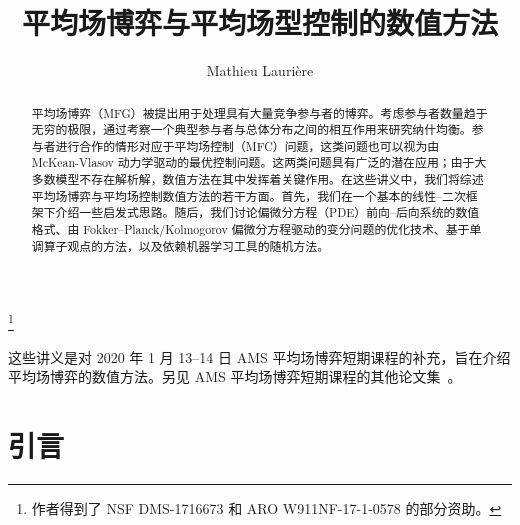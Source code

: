 \documentclass{amsproc}
\theoremstyle{definition}
\theoremstyle{remark}
\numberwithin{equation}{section}
\begin{document}
\title[平均场博弈与平均场控制的数值方法]{平均场博弈与平均场型控制的数值方法}


\author{Mathieu Lauri{\`e}re}
\address{普林斯顿大学运筹学与金融工程系（ORFE），Sherrerd Hall，美国新泽西州普林斯顿}
\curraddr{}
\thanks{作者得到了 NSF DMS-1716673 和 ARO W911NF-17-1-0578 的部分资助。}



\date{}

\begin{abstract}
平均场博弈（MFG）被提出用于处理具有大量竞争参与者的博弈。考虑参与者数量趋于无穷的极限，通过考察一个典型参与者与总体分布之间的相互作用来研究纳什均衡。参与者进行合作的情形对应于平均场控制（MFC）问题，这类问题也可以视为由 McKean-Vlasov 动力学驱动的最优控制问题。这两类问题具有广泛的潜在应用；由于大多数模型不存在解析解，数值方法在其中发挥着关键作用。在这些讲义中，我们将综述平均场博弈与平均场控制数值方法的若干方面。首先，我们在一个基本的线性--二次框架下介绍一些启发式思路。随后，我们讨论偏微分方程（PDE）前向--后向系统的数值格式、由 Fokker--Planck/Kolmogorov 偏微分方程驱动的变分问题的优化技术、基于单调算子观点的方法，以及依赖机器学习工具的随机方法。
\end{abstract}

\maketitle



\setcounter{tocdepth}{2}
\tableofcontents








这些讲义是对 2020 年 1 月 13--14 日 AMS 平均场博弈短期课程的补充，旨在介绍平均场博弈的数值方法。另见 AMS 平均场博弈短期课程的其他论文集~\cite{carmona-AMS-tmp,delarue-AMS-tmp,gravesmalhame-AMS-tmp,lacker-AMS-tmp,ramanan-AMS-tmp}。




\section{\bf 引言}
\end{document}
